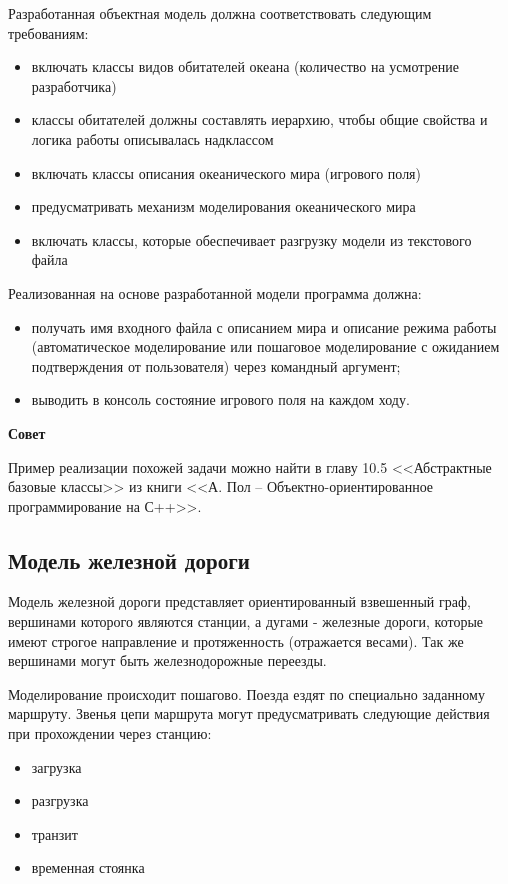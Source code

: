 \documentclass[a4paper,12pt]{article}
\begin{document}
Разработанная объектная модель должна соответствовать следующим требованиям:


\begin{itemize}
\item включать классы видов обитателей океана (количество на
  усмотрение разработчика)
\item классы обитателей должны составлять иерархию, чтобы общие
  свойства и логика работы описывалась надклассом
\item включать классы описания океанического мира (игрового поля)
\item предусматривать механизм моделирования океанического мира
\item включать классы, которые обеспечивает разгрузку модели из
  текстового файла
\end{itemize}

Реализованная на основе разработанной модели программа должна:

\begin{itemize}
\item получать имя входного файла с описанием мира и описание режима
  работы (автоматическое моделирование или пошаговое моделирование с
  ожиданием подтверждения от пользователя) через командный аргумент;
\item выводить в консоль состояние игрового поля на каждом ходу.
\end{itemize}

\textbf{Совет}

Пример реализации похожей задачи можно найти в главу 10.5
<<Абстрактные базовые классы>> из книги <<А. Пол –
Объектно-ориентированное программирование на С++>>.

\subsection{Модель железной дороги}

Модель железной дороги представляет ориентированный взвешенный граф,
вершинами которого являются станции, а дугами - железные дороги,
которые имеют строгое направление и протяженность (отражается
весами). Так же вершинами могут быть железнодорожные переезды.

Моделирование происходит пошагово. Поезда ездят по специально
заданному маршруту. Звенья цепи маршрута могут предусматривать
следующие действия при прохождении через станцию:

\begin{itemize}
\item загрузка
\item разгрузка
\item транзит
\item временная стоянка
\end{itemize}
\end{document}
